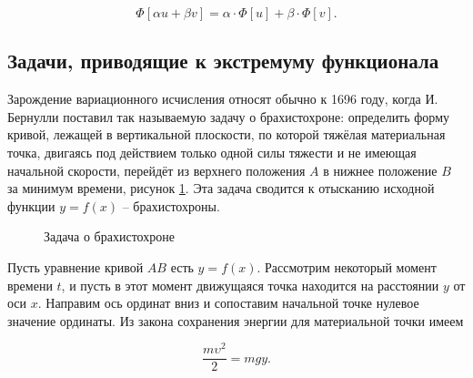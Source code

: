 \documentclass{article}
\begin{document}
\begin{displaymath}
    \Phi[\alpha u + \beta v] = \alpha \cdot \Phi[u] + \beta \cdot \Phi[v].
\end{displaymath}


\subsection{Задачи, приводящие к экстремуму функционала}

Зарождение вариационного исчисления относят обычно к 1696 году, когда И. Бернулли поставил так называемую задачу о брахистохроне: определить форму кривой, лежащей в вертикальной плоскости, по которой тяжёлая материальная точка, двигаясь под действием только одной силы тяжести и не имеющая начальной скорости, перейдёт из верхнего положения $A$ в нижнее положение $B$ за минимум времени, рисунок \ref{img_brachistochrone}. Эта задача сводится к отысканию исходной функции $y = f(x)$ – брахистохроны.

\begin{figure}[h!]
\caption{Задача о брахистохроне}
\label{img_brachistochrone}
\end{figure}

Пусть уравнение кривой $AB$ есть $y = f(x)$. Рассмотрим некоторый момент времени $t$, и пусть в этот момент движущаяся точка находится на расстоянии $y$ от оси $x$. Направим ось ординат вниз и сопоставим начальной точке нулевое значение ординаты. Из закона сохранения энергии для материальной точки имеем

\begin{displaymath}
    \frac{m\upsilon^2}{2} = mgy.
\end{displaymath}
\end{document}
